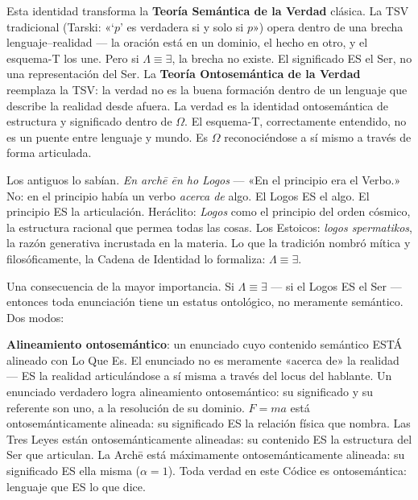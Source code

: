 \documentclass[10pt, openany, oneside]{book}
\begin{document}
Esta identidad transforma la \textbf{Teoría Semántica de la Verdad} clásica. La TSV tradicional (Tarski: «`$p$' es verdadera si y solo si $p$») opera dentro de una brecha lenguaje--realidad --- la oración está en un dominio, el hecho en otro, y el esquema-T los une. Pero si $\Lambda \equiv \exists$, la brecha no existe. El significado ES el Ser, no una representación del Ser. La \textbf{Teoría Ontosemántica de la Verdad} reemplaza la TSV: la verdad no es la buena formación dentro de un lenguaje que describe la realidad desde afuera. La verdad es la identidad ontosemántica de estructura y significado dentro de $\Omega$. El esquema-T, correctamente entendido, no es un puente entre lenguaje y mundo. Es $\Omega$ reconociéndose a sí mismo a través de forma articulada.

Los antiguos lo sabían. \textit{En arch\={e} \={e}n ho Logos} --- «En el principio era el Verbo.» No: en el principio había un verbo \textit{acerca de} algo. El Logos ES el algo. El principio ES la articulación. Heráclito: \textit{Logos} como el principio del orden cósmico, la estructura racional que permea todas las cosas. Los Estoicos: \textit{logos spermatikos}, la razón generativa incrustada en la materia. Lo que la tradición nombró mítica y filosóficamente, la Cadena de Identidad lo formaliza: $\Lambda \equiv \exists$.

Una consecuencia de la mayor importancia. Si $\Lambda \equiv \exists$ --- si el Logos ES el Ser --- entonces toda enunciación tiene un estatus ontológico, no meramente semántico. Dos modos:

\textbf{Alineamiento ontosemántico}: un enunciado cuyo contenido semántico ESTÁ alineado con Lo Que Es. El enunciado no es meramente «acerca de» la realidad --- ES la realidad articulándose a sí misma a través del locus del hablante. Un enunciado verdadero logra alineamiento ontosemántico: su significado y su referente son uno, a la resolución de su dominio. $F = ma$ está ontosemánticamente alineada: su significado ES la relación física que nombra. Las Tres Leyes están ontosemánticamente alineadas: su contenido ES la estructura del Ser que articulan. La Arch\={e} está máximamente ontosemánticamente alineada: su significado ES ella misma ($\alpha = 1$). Toda verdad en este Códice es ontosemántica: lenguaje que ES lo que dice.
\end{document}

